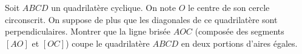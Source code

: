 Soit $ABCD$ un quadrilatère cyclique. On note $O$ le centre de son cercle circonscrit. On suppose de plus que les diagonales de ce quadrilatère sont perpendiculaires. Montrer que la ligne brisée $AOC$ (composée des segments $[AO]$ et $[OC]$) coupe le quadrilatère $ABCD$ en deux portions d'aires égales.